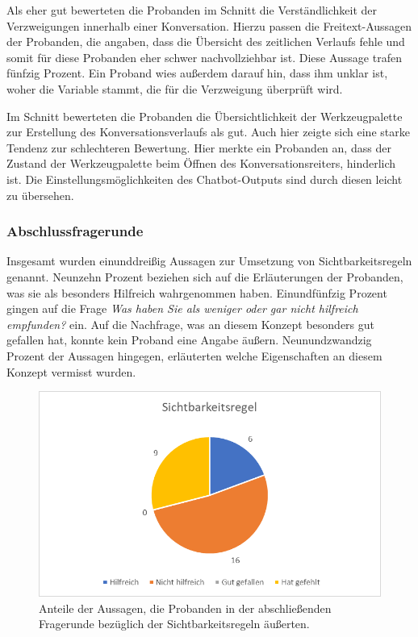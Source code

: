 Als eher gut bewerteten die Probanden im Schnitt die Verständlichkeit der Verzweigungen innerhalb einer Konversation. Hierzu passen die Freitext-Aussagen der Probanden, die angaben, dass die Übersicht des zeitlichen Verlaufs fehle und somit für diese Probanden eher schwer nachvollziehbar ist. Diese Aussage trafen fünfzig Prozent. Ein Proband wies außerdem darauf hin, dass ihm unklar ist, woher die Variable stammt, die für die Verzweigung überprüft wird. 

Im Schnitt bewerteten die Probanden die Übersichtlichkeit der Werkzeugpalette zur Erstellung des Konversationsverlaufs als gut. Auch hier zeigte sich eine starke Tendenz zur schlechteren Bewertung. Hier merkte ein Probanden an, dass der Zustand der Werkzeugpalette beim Öffnen des Konversationsreiters, hinderlich ist. Die Einstellungsmöglichkeiten des Chatbot-Outputs sind durch diesen leicht zu übersehen. 

\subsubsection{Abschlussfragerunde}
Insgesamt wurden einunddreißig Aussagen zur Umsetzung von Sichtbarkeitsregeln genannt. Neunzehn Prozent beziehen sich auf die Erläuterungen der Probanden, was sie als besonders Hilfreich wahrgenommen haben. Einundfünfzig Prozent gingen auf die Frage \emph{Was haben Sie als weniger oder gar nicht hilfreich empfunden?} ein. Auf die Nachfrage, was an diesem Konzept besonders gut gefallen hat, konnte kein Proband eine Angabe äußern. Neunundzwandzig Prozent der Aussagen hingegen, erläuterten welche Eigenschaften an diesem Konzept vermisst wurden.


\begin{figure}[h]
\centering
\includegraphics[width=1\textwidth]{pictures/diagramme/aussagensichtb}
\caption{Anteile der Aussagen, die Probanden in der abschließenden Fragerunde bezüglich der Sichtbarkeitsregeln äußerten.}
\label{aussagensichtb}
\end{figure}

